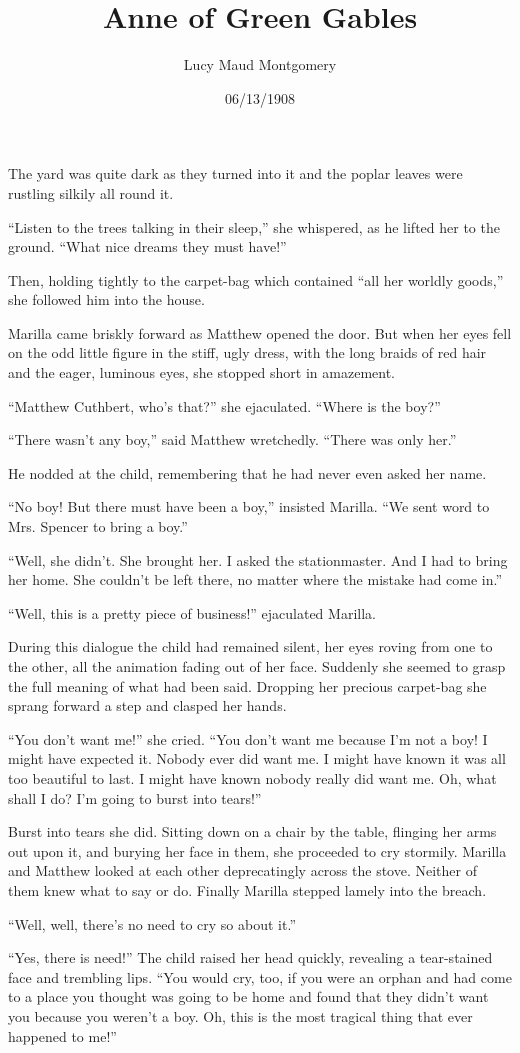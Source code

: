 \documentclass[a4paper]{article}
\title{Anne of Green Gables}
\author{Lucy Maud Montgomery}
\date{06/13/1908}
\begin{document}
\maketitle

{\tiny The yard was quite dark as they turned into it and the poplar leaves were rustling silkily all round it.

``Listen to the trees talking in their sleep,'' she whispered, as he lifted her to the ground. ``What nice dreams they must have!''

Then, holding tightly to the carpet-bag which contained ``all her worldly goods,'' she followed him into the house.

Marilla came briskly forward as Matthew opened the door. But when her eyes fell on the odd little figure in the stiff, ugly dress, with the long braids of red hair and the eager, luminous eyes, she stopped short in amazement.}

{\scriptsize ``Matthew Cuthbert, who's that?'' she ejaculated. ``Where is the boy?''

``There wasn't any boy,'' said Matthew wretchedly. ``There was only her.''

He nodded at the child, remembering that he had never even asked her name.

``No boy! But there must have been a boy,'' insisted Marilla. ``We sent word to Mrs. Spencer to bring a boy.''

``Well, she didn't. She brought her. I asked the stationmaster. And I had to bring her home. She couldn't be left there, no matter where the mistake had come in.''

``Well, this is a pretty piece of business!'' ejaculated Marilla.

During this dialogue the child had remained silent, her eyes roving from one to the other, all the animation fading out of her face. Suddenly she seemed to grasp the full meaning of what had been said. Dropping her precious carpet-bag she sprang forward a step and clasped her hands.}

{\footnotesize ``You don't want me!'' she cried. ``You don't want me because I'm not a boy! I might have expected it. Nobody ever did want me. I might have known it was all too beautiful to last. I might have known nobody really did want me. Oh, what shall I do? I'm going to burst into tears!''

Burst into tears she did. Sitting down on a chair by the table, flinging her arms out upon it, and burying her face in them, she proceeded to cry stormily. Marilla and Matthew looked at each other deprecatingly across the stove. Neither of them knew what to say or do. Finally Marilla stepped lamely into the breach.

``Well, well, there's no need to cry so about it.''

``Yes, there is need!'' The child raised her head quickly, revealing a tear-stained face and trembling lips. ``You would cry, too, if you were an orphan and had come to a place you thought was going to be home and found that they didn't want you because you weren't a boy. Oh, this is the most tragical thing that ever happened to me!''}
\end{document}
